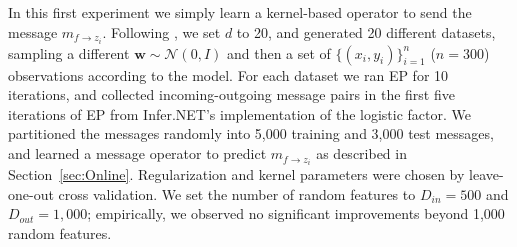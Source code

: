 \documentclass[english]{article}
\theoremstyle{plain}
\theoremstyle{plain}
\newcommand{\factor}{f}				%
\newcommand{\msg}[2]{m_{#1 \rightarrow #2}}			%
\newcommand{\secref}[1]{Section~\ref{#1}}
\begin{document}
In this first experiment we simply learn a kernel-based operator to send the message $\msg{\factor}{z_i}$.
Following \cite{Eslami2014}, we set $d$ to 20, and generated 20 different datasets, sampling 
a different $\boldsymbol{w} \sim \mathcal{N}(0, I)$ and then a set of $\{(x_i, y_i)\}_{i=1}^n$ ($n=300$) observations according to the model.
For each dataset we ran EP for 10 iterations, and collected incoming-outgoing message pairs in 
the first five iterations of EP from Infer.NET's implementation of the 
logistic factor.
We partitioned the messages randomly into 5,000 training and 
3,000 test messages, and learned a message operator to predict $m_{f\rightarrow z_i}$
as described in \secref{sec:Online}. 
Regularization and kernel parameters were chosen by leave-one-out cross validation.
We set the number of random features to $D_{in}=500$ and $D_{out}=1,000$; 
empirically, we observed no significant improvements beyond 1,000 random features.
\end{document}
